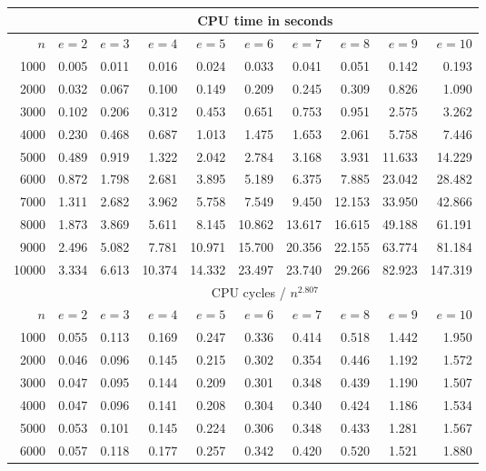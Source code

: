 \documentclass{sig-alternate}
\begin{document}
\begin{table*}
\centering
\begin{small}
\begin{tabular}{|r||r|r|r|r|r|r|r|r|r|}
\hline
     & \multicolumn{9}{|c|}{CPU time in seconds}\\
\hline
$n$  & $e=2$ & $e=3$ & $e=4$ & $e=5$ & $e=6$ & $e=7$ & $e=8$ & $e=9$ & $e=10$\\
\hline
 1000 & 0.005 & 0.011 &  0.016 &  0.024 &  0.033 &  0.041 &  0.051 &  0.142 &   0.193\\
 2000 & 0.032 & 0.067 &  0.100 &  0.149 &  0.209 &  0.245 &  0.309 &  0.826 &   1.090\\
 3000 & 0.102 & 0.206 &  0.312 &  0.453 &  0.651 &  0.753 &  0.951 &  2.575 &   3.262\\
 4000 & 0.230 & 0.468 &  0.687 &  1.013 &  1.475 &  1.653 &  2.061 &  5.758 &   7.446\\
 5000 & 0.489 & 0.919 &  1.322 &  2.042 &  2.784 &  3.168 &  3.931 & 11.633 &  14.229\\
 6000 & 0.872 & 1.798 &  2.681 &  3.895 &  5.189 &  6.375 &  7.885 & 23.042 &  28.482\\
 7000 & 1.311 & 2.682 &  3.962 &  5.758 &  7.549 &  9.450 & 12.153 & 33.950 &  42.866\\
 8000 & 1.873 & 3.869 &  5.611 &  8.145 & 10.862 & 13.617 & 16.615 & 49.188 &  61.191\\
 9000 & 2.496 & 5.082 &  7.781 & 10.971 & 15.700 & 20.356 & 22.155 & 63.774 &  81.184\\
10000 & 3.334 & 6.613 & 10.374 & 14.332 & 23.497 & 23.740 & 29.266 & 82.923 & 147.319\\
\hline
\hline
     & \multicolumn{9}{|c|}{CPU cycles / $n^{2.807}$}\\
\hline
$n$  & $e=2$ & $e=3$ & $e=4$ & $e=5$ & $e=6$ & $e=7$ & $e=8$ & $e=9$ & $e=10$\\
\hline
 1000 & 0.055 & 0.113 & 0.169 & 0.247 & 0.336 & 0.414 & 0.518 & 1.442 & 1.950\\
 2000 & 0.046 & 0.096 & 0.145 & 0.215 & 0.302 & 0.354 & 0.446 & 1.192 & 1.572\\
 3000 & 0.047 & 0.095 & 0.144 & 0.209 & 0.301 & 0.348 & 0.439 & 1.190 & 1.507\\
 4000 & 0.047 & 0.096 & 0.141 & 0.208 & 0.304 & 0.340 & 0.424 & 1.186 & 1.534\\
 5000 & 0.053 & 0.101 & 0.145 & 0.224 & 0.306 & 0.348 & 0.433 & 1.281 & 1.567\\
 6000 & 0.057 & 0.118 & 0.177 & 0.257 & 0.342 & 0.420 & 0.520 & 1.521 & 1.880\\

\end{tabular}
\end{small}
\end{table*}
\end{document}
